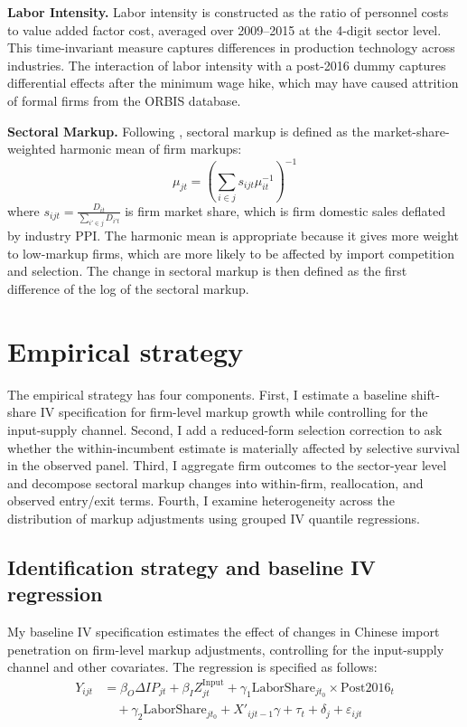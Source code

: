 \documentclass[12pt]{article}
\begin{document}
\textbf{Labor Intensity.} Labor intensity is constructed as the ratio of personnel costs to value added factor cost, averaged over 2009--2015 at the 4-digit sector level. This time-invariant measure captures differences in production technology across industries. The interaction of labor intensity with a post-2016 dummy captures differential effects after the minimum wage hike, which may have caused attrition of formal firms from the ORBIS database.

\textbf{Sectoral Markup.} Following \textcite{bursteinBottomUpMarkupFluctuations2025}, sectoral markup is defined as the market-share-weighted harmonic mean of firm markups:
\[
\mu_{jt} = \left( \sum_{i \in j} s_{ijt} \mu_{it}^{-1} \right)^{-1}
\]
where $s_{ijt} = \frac{D_{it}}{\sum_{i' \in j} D_{i't}}$ is firm market share, which is firm domestic sales deflated by industry PPI. The harmonic mean is appropriate because it gives more weight to low-markup firms, which are more likely to be affected by import competition and selection. The change in sectoral markup is then defined as the first difference of the log of the sectoral markup.

\section{Empirical strategy}
The empirical strategy has four components. First, I estimate a baseline shift-share IV specification for firm-level markup growth while controlling for the input-supply channel. Second, I add a reduced-form selection correction to ask whether the within-incumbent estimate is materially affected by selective survival in the observed panel. Third, I aggregate firm outcomes to the sector-year level and decompose sectoral markup changes into within-firm, reallocation, and observed entry/exit terms. Fourth, I examine heterogeneity across the distribution of markup adjustments using grouped IV quantile regressions.

\subsection{Identification strategy and baseline IV regression}

My baseline IV specification estimates the effect of changes in Chinese import penetration on firm-level markup adjustments, controlling for the input-supply channel and other covariates. The regression is specified as follows:
\begin{equation}
\begin{aligned}
Y_{ijt} &= \beta_O \Delta IP_{jt} + \beta_I Z_{jt}^{\text{Input}} + \gamma_1 \text{LaborShare}_{jt_0} \times \text{Post2016}_t \\
&\quad + \gamma_2 \text{LaborShare}_{jt_0} + X'_{ijt-1} \gamma + \tau_t + \delta_j + \varepsilon_{ijt}
\end{aligned}
\end{equation}
\end{document}
